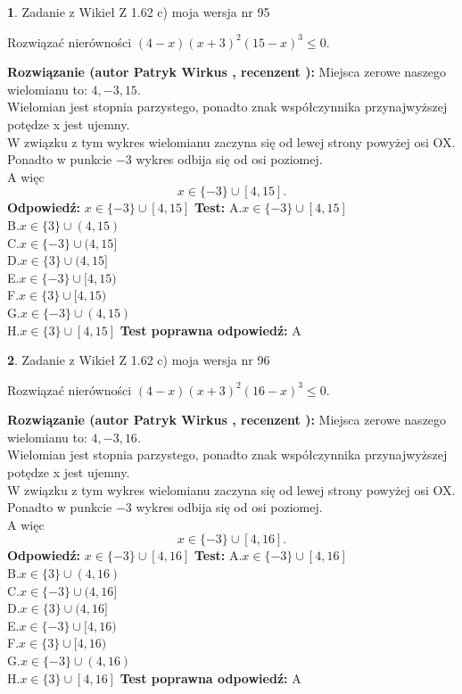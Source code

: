 \documentclass[12pt, a4paper]{article}
\theoremstyle{definition} %
\newtheorem{zad}{}
\newcommand{\zadStart}[1]{\begin{zad}#1\newline}
\newcommand{\zadStop}{\end{zad}}
\newcommand{\rozwStart}[2]{\noindent \textbf{Rozwiązanie (autor #1 , recenzent #2): }\newline}
\newcommand{\rozwStop}{\newline}
\newcommand{\odpStart}{\noindent \textbf{Odpowiedź:}\newline}
\newcommand{\odpStop}{\newline}
\newcommand{\testStart}{\noindent \textbf{Test:}\newline}
\newcommand{\testStop}{\newline}
\newcommand{\kluczStart}{\noindent \textbf{Test poprawna odpowiedź:}\newline}
\newcommand{\kluczStop}{\newline}
\begin{document}
\zadStart{Zadanie z Wikieł Z 1.62 c) moja wersja nr 95}

Rozwiązać nierówności $(4-x)(x+3)^{2}(15-x)^{3}\le0$.
\zadStop
\rozwStart{Patryk Wirkus}{}
Miejsca zerowe naszego wielomianu to: $4, -3, 15$.\\
Wielomian jest stopnia parzystego, ponadto znak współczynnika przy\linebreak najwyższej potędze x jest ujemny.\\ W związku z tym wykres wielomianu zaczyna się od lewej strony powyżej osi OX.\\
Ponadto w punkcie $-3$ wykres odbija się od osi poziomej.\\
A więc $$x \in \{-3\} \cup [4,15].$$
\rozwStop
\odpStart
$x \in \{-3\} \cup [4,15]$
\odpStop
\testStart
A.$x \in \{-3\} \cup [4,15]$\\
B.$x \in \{3\} \cup (4,15)$\\
C.$x \in \{-3\} \cup (4,15]$\\
D.$x \in \{3\} \cup (4,15]$\\
E.$x \in \{-3\} \cup [4,15)$\\
F.$x \in \{3\} \cup [4,15)$\\
G.$x \in \{-3\} \cup (4,15)$\\
H.$x \in \{3\} \cup [4,15]$
\testStop
\kluczStart
A
\kluczStop



\zadStart{Zadanie z Wikieł Z 1.62 c) moja wersja nr 96}

Rozwiązać nierówności $(4-x)(x+3)^{2}(16-x)^{3}\le0$.
\zadStop
\rozwStart{Patryk Wirkus}{}
Miejsca zerowe naszego wielomianu to: $4, -3, 16$.\\
Wielomian jest stopnia parzystego, ponadto znak współczynnika przy\linebreak najwyższej potędze x jest ujemny.\\ W związku z tym wykres wielomianu zaczyna się od lewej strony powyżej osi OX.\\
Ponadto w punkcie $-3$ wykres odbija się od osi poziomej.\\
A więc $$x \in \{-3\} \cup [4,16].$$
\rozwStop
\odpStart
$x \in \{-3\} \cup [4,16]$
\odpStop
\testStart
A.$x \in \{-3\} \cup [4,16]$\\
B.$x \in \{3\} \cup (4,16)$\\
C.$x \in \{-3\} \cup (4,16]$\\
D.$x \in \{3\} \cup (4,16]$\\
E.$x \in \{-3\} \cup [4,16)$\\
F.$x \in \{3\} \cup [4,16)$\\
G.$x \in \{-3\} \cup (4,16)$\\
H.$x \in \{3\} \cup [4,16]$
\testStop
\kluczStart
A
\kluczStop
\end{document}
